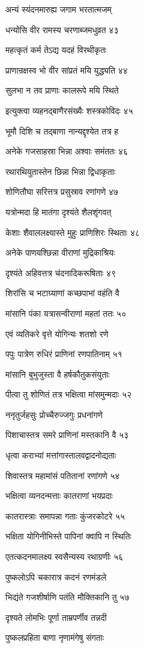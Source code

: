 अन्यं स्यंदनमारुह्य जगाम भरतात्मजम्

धन्योसि वीर रामस्य चरणाब्जमधुव्रत ४३

महत्कृतं कर्म तेऽद्य यदहं विरथीकृतः

प्राणान्रक्षस्व भो वीर सांप्रतं मयि युद्ध्यति ४४

सुलभा न तव प्राणाः कालरूपे मयि स्थिते

इत्युक्त्वा व्यहनद्बाणैरसंख्यैः शस्त्रकोविदः ४५

भूमौ दिशि च तद्बाणा नान्यद्दृश्येत तत्र ह

अनेके गजसाहस्रा भिन्ना अश्वाः समंततः ४६

रथारथियुतास्तेन छिन्ना भिन्ना द्विधाकृताः

शोणितौघा सरित्तत्र प्रसुस्राव रणांगणे ४७

यत्रोन्मदा हि मातंगा दृश्यंते शैलशृंगवत्

केशाः शैवाललक्ष्यास्ते मुहुः प्राणिशिरः स्थिताः ४८

अनेके पाणयश्छिन्ना वीराणां मुद्रिकाश्रियः

दृश्यंते अहिवत्तत्र चंदनादिकरूषिताः ४९

शिरांसि च भटाग्र्याणां कच्छपाभां वहंति वै

मांसानि पंका यत्रासन्वीराणां महतां ततः ५०

एवं व्यतिकरे वृत्ते योगिन्यः शतशो रणे

पपुः पात्रेण रुधिरं प्राणिनां रणपातिनाम् ५१

मांसानि बुभुजुस्ता वै हर्षकौतुकसंयुताः

पीत्वा तु शोणितं तत्र भक्षित्वा मांसमुन्मदाः ५२

ननृतुर्जहसुः प्रोच्चैरुज्जगुः प्रधनांगणे

पिशाचास्तत्र समरे प्राणिनां मस्तकानि वै ५३

धृत्वा कराभ्यां मत्तांगास्तालवद्वादनोद्यताः

शिवास्तत्र महामांसं पतितानां रणांगणे ५४

भक्षित्वा व्यनदन्मत्ताः कातराणां भयप्रदाः

कातरास्त्राः समापन्ना गताः कुंजरकोटरे ५५

भक्षिता योगिनीभिस्ते पापिनां क्वापि न स्थितिः

एतत्कदनमालक्ष्य स्वसैन्यस्य रथाग्रणीः ५६

पुष्कलोऽपि चकारात्र कदनं रणमंडले

भिद्यंते गजशीर्षाणि पतंति मौक्तिकानि तु ५७

दृश्यते लोमभिः पूर्णा ताम्रपर्णीव तन्नदी

पुष्कलप्रहिता बाणा नृणामंगेषु संगताः

